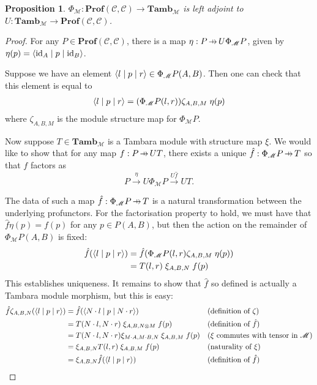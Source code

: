 \documentclass[11pt,letterpaper]{article}
\theoremstyle{plain}
\newtheorem{proposition}[theorem]{Proposition}
\theoremstyle{definition}
\newcommand{\C}{\mathscr{C}}
\newcommand{\M}{\mathscr{M}}
\newcommand{\Pastro}{\Phi}
\newcommand{\Prof}{\mathbf{Prof}}
\newcommand{\Tamb}{\mathbf{Tamb}}
\newcommand{\id}{\mathrm{id}}
\newcommand{\act}{\cdot}
\newcommand{\repthree}[3]{{\ensuremath \langle #1 \mid #2 \mid #3 \rangle}}
\newcommand{\hto}{\ensuremath{\,\mathaccent\shortmid\rightarrow\,}}
\begin{document}
\begin{proposition}
  $\Pastro_\M : \Prof(\C, \C) \to \Tamb_\M$ is left adjoint to $U : \Tamb_\M \to \Prof(\C, \C)$.
\end{proposition}
\begin{proof}
  For any $P \in \Prof(\C, \C)$, there is a map $\eta : P \hto U \Pastro_\M P$, given by $\eta(p) = \repthree{\id_A}{p}{\id_B}$.

  Suppose we have an element $\repthree{l}{p}{r} \in \Pastro_\M P(A,B)$. Then one can check that this element is equal to
  \begin{align*}
    \repthree{l}{p}{r} = (\Pastro_\M P(l, r)) \zeta_{A, B, M} \; \eta(p)
  \end{align*}
  where $\zeta_{A, B, M}$ is the module structure map for $\Pastro_\M P$.

  Now suppose $T \in \Tamb_\M$ is a Tambara module with structure map $\xi$. We would like to show that for any map $f : P \hto UT$, there exists a unique $\hat f : \Pastro_\M P \hto T$ so that $f$ factors as \[P \xrightarrow{\eta} U \Pastro_\M P \xrightarrow{U\hat f} UT. \]

  The data of such a map $\hat f : \Pastro_\M P \hto T$ is a natural transformation between the underlying profunctors. For the factorisation property to hold, we must have that $\hat{f}\eta(p) = f(p)$ for any $p \in P(A,B)$, but then the action on the remainder of $\Pastro_\M P(A, B)$ is fixed:
  \begin{align*}
    \hat{f}(\repthree{l}{p}{r}) 
    &= \hat{f}(\Pastro_\M P(l, r) \zeta_{A, B, M} \; \eta(p)) \\
    &=T(l, r) \; \xi_{A, B, N} \; f(p)
  \end{align*}
  This establishes uniqueness. It remains to show that $\hat{f}$ so defined is actually a Tambara module morphism, but this is easy:
  \begin{align*}
    \hat{f}\zeta_{A,B,N}(\repthree{l}{p}{r})
    &= \hat{f}(\repthree{N\act l}{p}{N\act r}) && \text{(definition of $\zeta$)}\\
    &= T(N\act l, N\act r) \; \xi_{A, B, N \otimes M} \; f(p) && \text{(definition of $\hat{f}$)}\\
    &= T(N\act l, N\act r) \xi_{M\act A,M\act B,N} \; \xi_{A, B, M} \; f(p) && \text{($\xi$ commutes with tensor in $\M$)} \\
    &= \xi_{A,B,N} T(l, r) \; \xi_{A, B, M} \; f(p) && \text{(naturality of $\xi$)} \\
    &= \xi_{A,B,N} \hat{f} (\repthree{l}{p}{r}) && \text{(definition of $\hat{f}$)}
  \end{align*}
\end{proof}
\end{document}
